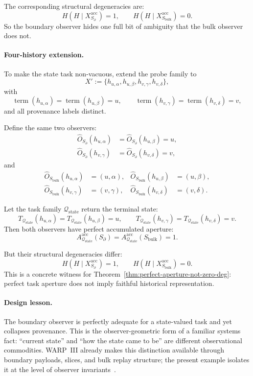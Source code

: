 \documentclass[11pt,twoside]{article}
\theoremstyle{definition}
\newcommand{\acc}{\mathrm{acc}}
\newcommand{\bulk}{\mathrm{bulk}}
\begin{document}
The corresponding structural degeneracies are:
\[
  H(H\mid X_{S_{\partial}}^{\acc})=1,
  \qquad
  H(H\mid X_{S_{\bulk}}^{\acc})=0.
\]
So the boundary observer hides one full bit of ambiguity that the bulk observer does not.

\paragraph{Four-history extension.}
To make the state task non-vacuous, extend the probe family to
\[
  X' :=
  \{ h_{u,\alpha}, h_{u,\beta}, h_{v,\gamma}, h_{v,\delta} \},
\]
with
\[
  \operatorname{term}(h_{u,\alpha})
  =
  \operatorname{term}(h_{u,\beta})
  =
  u,
  \qquad
  \operatorname{term}(h_{v,\gamma})
  =
  \operatorname{term}(h_{v,\delta})
  =
  v,
\]
and all provenance labels distinct.

Define the same two observers:
\begin{align*}
  \widehat{O}_{S_{\partial}}(h_{u,\alpha})
  &=
  \widehat{O}_{S_{\partial}}(h_{u,\beta})
  = u, \\
  \widehat{O}_{S_{\partial}}(h_{v,\gamma})
  &=
  \widehat{O}_{S_{\partial}}(h_{v,\delta})
  = v,
\end{align*}
and
\begin{align*}
  \widehat{O}_{S_{\bulk}}(h_{u,\alpha}) &= (u,\alpha), &
  \widehat{O}_{S_{\bulk}}(h_{u,\beta}) &= (u,\beta), \\
  \widehat{O}_{S_{\bulk}}(h_{v,\gamma}) &= (v,\gamma), &
  \widehat{O}_{S_{\bulk}}(h_{v,\delta}) &= (v,\delta).
\end{align*}

Let the task family \(\mathcal{Q}_{\mathrm{state}}\) return the terminal state:
\[
  T_{\mathcal{Q}_{\mathrm{state}}}(h_{u,\alpha})
  =
  T_{\mathcal{Q}_{\mathrm{state}}}(h_{u,\beta})
  = u,
  \qquad
  T_{\mathcal{Q}_{\mathrm{state}}}(h_{v,\gamma})
  =
  T_{\mathcal{Q}_{\mathrm{state}}}(h_{v,\delta})
  = v.
\]
Then both observers have perfect accumulated aperture:
\[
  A^{\acc}_{\mathcal{Q}_{\mathrm{state}}}(S_{\partial})
  =
  A^{\acc}_{\mathcal{Q}_{\mathrm{state}}}(S_{\bulk})
  = 1.
\]

But their structural degeneracies differ:
\[
  H(H\mid X_{S_{\partial}}^{\acc})=1,
  \qquad
  H(H\mid X_{S_{\bulk}}^{\acc})=0.
\]
This is a concrete witness for Theorem~\ref{thm:perfect-aperture-not-zero-deg}: perfect task aperture does not imply faithful historical representation.

\paragraph{Design lesson.}
The boundary observer is perfectly adequate for a state-valued task and yet collapses provenance. This is the observer-geometric form of a familiar systems fact: ``current state'' and ``how the state came to be'' are different observational commodities. WARP~III already makes this distinction available through boundary payloads, slices, and bulk replay structure; the present example isolates it at the level of observer invariants~\cite{ross_paper_iii,ross_paper_iv,ross_paper_v}.
\end{document}
